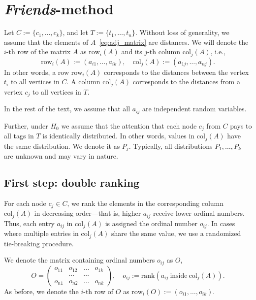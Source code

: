 \section{\textit{Friends}-method}
\label{sec:method}
Let $C := \{c_1, \dots, c_k\}$, and let $T := \{t_1, \dots, t_n\}$. Without loss of generality, we assume that the elements of $A$~\eqref{eq:adj_matrix} are distances.  
 We will denote the $i$-th row of the matrix $A$ as $\text{row}_i(A)$ and its $j$-th column $\text{col}_j(A)$, i.e.,
\[
\text{row}_i(A) := (a_{i1}, \dots, a_{ik}),
\quad
\text{col}_j(A) := (a_{1j}, \dots, a_{nj}).
\]
In other words, a row $\text{row}_i(A)$ corresponds to the distances between the vertex $t_i$ to all vertices in $C$. A column $\text{col}_j(A)$ corresponds to the distances from a vertex $c_j$ to all vertices in $T$.

In the rest of the text, we assume that all $a_{ij}$ are independent random variables.

Further, under $H_0$ we assume that the attention that each node $c_j$ from $C$ pays to all tags in $T$ is identically distributed. In other words, values in $\text{col}_j(A)$ have the same distribution. We denote it as $P_j$. Typically, all distributions $P_1, \dots, P_k$ are unknown and may vary in nature. 

\subsection*{First step: double ranking}

For each node $c_j \in C$, we rank the elements in the corresponding column $\text{col}_j(A)$ in decreasing order---that is, higher $a_{ij}$ receive lower ordinal numbers. Thus, each entry $a_{ij} $ in $\text{col}_j(A)$ is assigned the ordinal number $o_{ij}$. In cases where multiple entries in $\text{col}_j(A)$ share the same value, we use a randomized tie-breaking procedure.

We denote the matrix containing ordinal numbers $o_{ij}$ as $O$, 
\begin{equation*}
O = \begin{pmatrix}
o_{11} & o_{12} & \dots & o_{1k} \\
 &\cdots & \cdots & \\
o_{n1} & o_{n2} & \dots & o_{nk}
\end{pmatrix}, 
\quad
o_{ij} :=\text{rank}\left(a_{ij}~ \text{inside}~\text{col}_j(A)\right).
\end{equation*}
As before, we denote the $i$-th row of $O$ as $\text{row}_i(O) := (o_{i1}, \dots, o_{ik})$.

